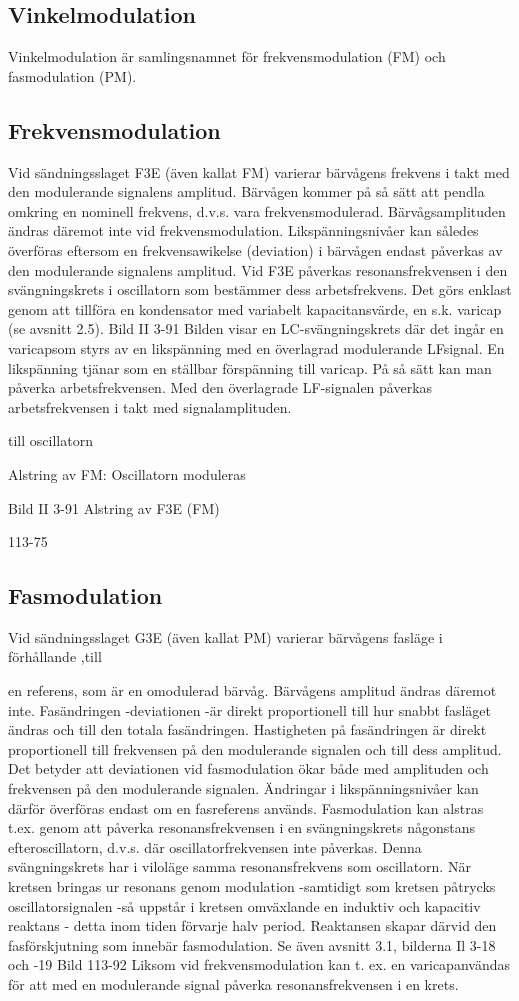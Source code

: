 {\subsection{Vinkelmodulation}
Vinkelmodulation är samlingsnamnet för frekvensmodulation (FM) och fasmodulation
(PM).

\subsection{Frekvensmodulation}
Vid sändningsslaget F3E (även kallat FM)
varierar bärvågens frekvens i takt med den
modulerande signalens amplitud. Bärvågen
kommer på så sätt att pendla omkring en
nominell frekvens, d.v.s. vara frekvensmodulerad. Bärvågsamplituden ändras däremot
inte vid frekvensmodulation.
Likspänningsnivåer kan således överföras eftersom en frekvensawikelse (deviation) i bärvågen endast påverkas av den
modulerande signalens amplitud.
Vid F3E påverkas resonansfrekvensen i
den svängningskrets i oscillatorn som bestämmer dess arbetsfrekvens. Det görs enklast genom att tillföra en kondensator med
variabelt kapacitansvärde, en s.k. varicap
(se avsnitt 2.5).
Bild II 3-91
Bilden visar en LC-svängningskrets där
det ingår en varicapsom styrs av en likspänning med en överlagrad modulerande LFsignal. En likspänning tjänar som en ställbar
förspänning till varicap. På så sätt kan man
påverka arbetsfrekvensen. Med den överlagrade LF-signalen påverkas arbetsfrekvensen i takt med signalamplituden.

till oscillatorn

Alstring av FM:
Oscillatorn moduleras

Bild II 3-91 Alstring av F3E (FM)

113-75

\subsection{Fasmodulation}
Vid sändningsslaget G3E (även kallat PM)
varierar bärvågens fasläge i förhållande ,till

en referens, som är en omodulerad bärvåg.
Bärvågens amplitud ändras däremot inte.
Fasändringen -deviationen -är direkt proportionell till hur snabbt fasläget ändras och
till den totala fasändringen. Hastigheten på
fasändringen är direkt proportionell till frekvensen på den modulerande signalen och till
dess amplitud.
Det betyder att deviationen vid fasmodulation ökar både med amplituden och frekvensen på den modulerande signalen. Ändringar i likspänningsnivåer kan därför överföras endast om en fasreferens används.
Fasmodulation kan alstras t.ex. genom
att påverka resonansfrekvensen i en svängningskrets någonstans efteroscillatorn, d.v.s.
där oscillatorfrekvensen inte påverkas. Denna svängningskrets har i viloläge samma
resonansfrekvens som oscillatorn. När kretsen bringas ur resonans genom modulation
-samtidigt som kretsen påtrycks oscillatorsignalen -så uppstår i kretsen omväxlande
en induktiv och kapacitiv reaktans - detta
inom tiden förvarje halv period. Reaktansen
skapar därvid den fasförskjutning som innebär fasmodulation. Se även avsnitt 3.1, bilderna Il 3-18 och -19
Bild 113-92
Liksom vid frekvensmodulation kan t. ex.
en varicapanvändas för att med en modulerande signal påverka resonansfrekvensen i
en krets.

}
